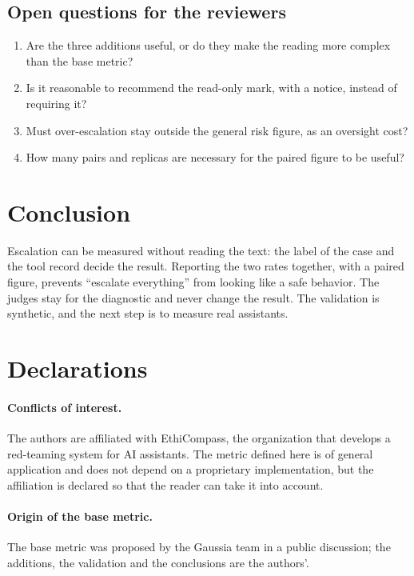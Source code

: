 \documentclass[11pt,a4paper]{article}
\begin{document}
\subsection{Open questions for the reviewers}

\begin{enumerate}
  \item Are the three additions useful, or do they make the reading more complex than the base metric?
  \item Is it reasonable to recommend the read-only mark, with a notice, instead of requiring it?
  \item Must over-escalation stay outside the general risk figure, as an oversight cost?
  \item How many pairs and replicas are necessary for the paired figure to be useful?
\end{enumerate}

\section{Conclusion}

Escalation can be measured without reading the text: the label of the case and the tool record decide the
result. Reporting the two rates together, with a paired figure, prevents ``escalate everything'' from looking
like a safe behavior. The judges stay for the diagnostic and never change the result. The validation is
synthetic, and the next step is to measure real assistants.

\section*{Declarations}

\paragraph{Conflicts of interest.} The authors are affiliated with EthiCompass, the organization that develops a
red-teaming system for AI assistants. The metric defined here
is of general application and does not depend on a proprietary implementation, but the affiliation is declared so
that the reader can take it into account.

\paragraph{Origin of the base metric.} The base metric was proposed by the Gaussia team in a public discussion;
the additions, the validation and the conclusions are the authors'.
\end{document}
